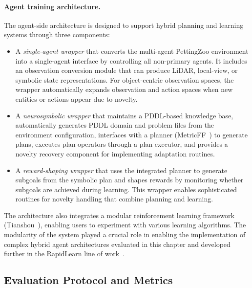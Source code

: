 \paragraph{Agent training architecture.} The agent-side architecture is designed to support hybrid planning and learning systems through three components:
\begin{itemize}[leftmargin=*]
    \item A \emph{single-agent wrapper} that converts the multi-agent PettingZoo environment into a single-agent interface by controlling all non-primary agents. It includes an observation conversion module that can produce LiDAR, local-view, or symbolic state representations. For object-centric observation spaces, the wrapper automatically expands observation and action spaces when new entities or actions appear due to novelty.
    \item A \emph{neurosymbolic wrapper} that maintains a PDDL-based knowledge base, automatically generates PDDL domain and problem files from the environment configuration, interfaces with a planner (MetricFF~\citep{hoffmann2003metricff}) to generate plans, executes plan operators through a plan executor, and provides a novelty recovery component for implementing adaptation routines.
    \item A \emph{reward-shaping wrapper} that uses the integrated planner to generate subgoals from the symbolic plan and shapes rewards by monitoring whether subgoals are achieved during learning. This wrapper enables sophisticated routines for novelty handling that combine planning and learning.
\end{itemize}

The architecture also integrates a modular reinforcement learning framework (Tianshou~\citep{weng2022tianshou}), enabling users to experiment with various learning algorithms. The modularity of the system played a crucial role in enabling the implementation of complex hybrid agent architectures evaluated in this chapter and developed further in the RapidLearn line of work~\citep{goel2022rapidlearn}.


\subsection{Evaluation Protocol and Metrics}
\label{sec:ng_evaluation}

